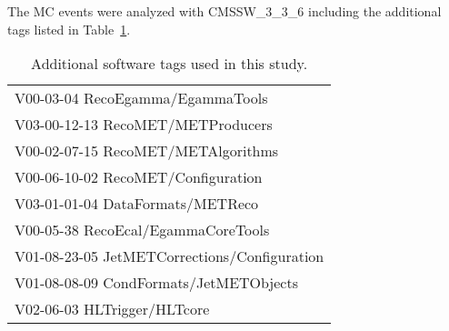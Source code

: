 The MC events were analyzed with CMSSW\_3\_3\_6 including the additional tags 
listed in Table~\ref{tab:tags}.

\begin{table} [htb]
\begin{center} 
\begin{tabular}{|l|} \hline
{V00-03-04 RecoEgamma/EgammaTools} \\
{V03-00-12-13 RecoMET/METProducers} \\
{V00-02-07-15 RecoMET/METAlgorithms} \\
{V00-06-10-02 RecoMET/Configuration} \\
{V03-01-01-04 DataFormats/METReco} \\
{V00-05-38 RecoEcal/EgammaCoreTools} \\
{V01-08-23-05 JetMETCorrections/Configuration} \\
{V01-08-08-09 CondFormats/JetMETObjects} \\
{V02-06-03 HLTrigger/HLTcore} \\
\hline
\end{tabular}
\caption{Additional software tags used in this study.\label{tab:tags}}
\end{center}
\end{table}
